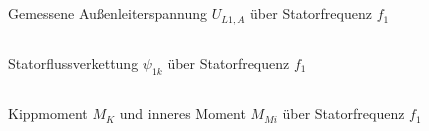 \chapter{}

\section{}

\section{}

\begin{figure}[h]
	\centering
	
	\caption{Gemessene Außenleiterspannung $ U_{L1,A}  $ über Statorfrequenz $ f_{1} $}
	\label{fig:6b:UL}
\end{figure}


\section{}

\begin{figure}[h]
	\centering
	
	\caption{Statorflussverkettung $ \psi_{1k} $ über Statorfrequenz $ f_{1} $}
	\label{fig:6c:psi}
\end{figure}

\section{}

\begin{figure}[h]
	\centering
	
	\caption{Kippmoment $ M_{K} $ und inneres Moment $ M_{Mi} $ über Statorfrequenz $ f_{1} $}
	\label{fig:6d:Momente}
\end{figure}